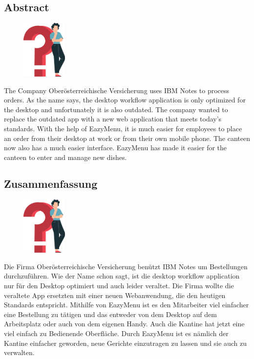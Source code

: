 \begin{spacing}{1}
    \chapter*{Abstract}
\end{spacing}
\begin{figure}
    \begin{center}
      \includegraphics[width=0.2\textwidth]{pics/question_mark.png}
    \end{center}
\end{figure}
The Company Oberösterreichische Versicherung uses IBM Notes to process orders.
As the name says, the desktop workflow application is only optimized for the desktop and unfortunately it is also outdated.
The company wanted to replace the outdated app with a new web application that meets today's standards.
With the help of EazyMenu, it is much easier for employees to place an order from their desktop at work or from their own mobile phone. The canteen now also has a much easier interface.
EazyMenu has made it easier for the canteen to enter and manage new dishes.


\newpage

\begin{spacing}{1}
    \chapter*{Zusammenfassung}
\end{spacing}
\begin{figure}
    \begin{center}
      \includegraphics[width=0.2\textwidth]{pics/question_mark.png}
    \end{center}
\end{figure}
\author{David Ignjatovic}
Die Firma Oberösterreichische Versicherung benützt IBM Notes um Bestellungen durchzuführen. 
Wie der Name schon sagt, ist die desktop workflow application nur für den Desktop optimiert und auch leider veraltet. 
Die Firma wollte die veraltete App ersetzten mit einer neuen Webanwendung, die den heutigen Standards entspricht. 
Mithilfe von EazyMenu ist es den Mitarbeiter viel einfacher eine Bestellung zu tätigen und das entweder von dem Desktop auf dem Arbeitsplatz oder auch von dem eigenen Handy. Auch die Kantine hat jetzt eine viel einfach zu Bedienende Oberfläche. 
Durch EazyMenu ist es nämlich der Kantine einfacher geworden, neue Gerichte einzutragen zu lassen und sie auch zu verwalten.